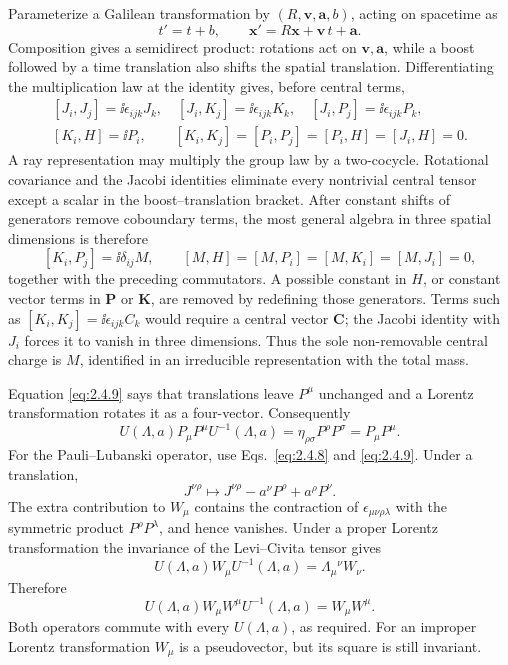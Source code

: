 \begin{enumerate}
Parameterize a Galilean transformation by
\((R,\mathbf v,\mathbf a,b)\), acting on spacetime as
\[
  t'=t+b,\qquad
  \mathbf x'=R\mathbf x+\mathbf v\,t+\mathbf a.
\]
Composition gives a semidirect product: rotations act on
\(\mathbf v,\mathbf a\), while a boost followed by a time translation
also shifts the spatial translation.  Differentiating the multiplication
law at the identity gives, before central terms,
\[
\begin{gathered}
 [J_i,J_j]=\ii\epsilon_{ijk}J_k,\quad
 [J_i,K_j]=\ii\epsilon_{ijk}K_k,\quad
 [J_i,P_j]=\ii\epsilon_{ijk}P_k,\\
 [K_i,H]=\ii P_i,\qquad
 [K_i,K_j]=[P_i,P_j]=[P_i,H]=[J_i,H]=0.
\end{gathered}
\]
A ray representation may multiply the group law by a two-cocycle.
Rotational covariance and the Jacobi identities eliminate every
nontrivial central tensor except a scalar in the boost--translation
bracket.  After constant shifts of generators remove coboundary terms, the
most general algebra in three spatial dimensions is therefore
\[
  [K_i,P_j]=\ii\delta_{ij}M,\qquad
  [M,H]=[M,P_i]=[M,K_i]=[M,J_i]=0,
\]
together with the preceding commutators.  A possible constant in \(H\), or
constant vector terms in \(\mathbf P\) or \(\mathbf K\), are removed by
redefining those generators.  Terms such as
\([K_i,K_j]=\ii\epsilon_{ijk}C_k\) would require a central vector
\(\mathbf C\); the Jacobi identity with \(J_i\) forces it to vanish in
three dimensions.  Thus the sole non-removable central charge is \(M\),
identified in an irreducible representation with the total mass.

Equation \eqref{eq:2.4.9} says that translations leave \(P^\mu\) unchanged
and a Lorentz transformation rotates it as a four-vector.  Consequently
\[
  U(\Lambda,a)P_\mu P^\mu U^{-1}(\Lambda,a)
  =\eta_{\rho\sigma}P^\rho P^\sigma=P_\mu P^\mu.
\]
For the Pauli--Lubanski operator, use Eqs.~\eqref{eq:2.4.8} and
\eqref{eq:2.4.9}.  Under a translation,
\[
  J^{\nu\rho}\longmapsto
  J^{\nu\rho}-a^\nu P^\rho+a^\rho P^\nu.
\]
The extra contribution to \(W_\mu\) contains the contraction of
\(\epsilon_{\mu\nu\rho\lambda}\) with the symmetric product
\(P^\rho P^\lambda\), and hence vanishes.  Under a proper Lorentz
transformation the invariance of the Levi--Civita tensor gives
\[
  U(\Lambda,a)W_\mu U^{-1}(\Lambda,a)
  =\Lambda_\mu{}^\nu W_\nu.
\]
Therefore
\[
  U(\Lambda,a)W_\mu W^\mu U^{-1}(\Lambda,a)
  =W_\mu W^\mu.
\]
Both operators commute with every \(U(\Lambda,a)\), as required.  For an
improper Lorentz transformation \(W_\mu\) is a pseudovector, but its square
is still invariant.


\end{enumerate}
